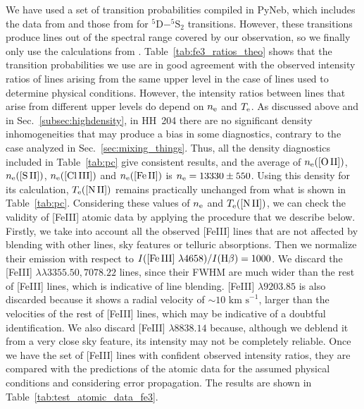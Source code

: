 \documentclass[twocolumn]{aastex63}
\begin{document}
We have used a set of transition probabilities compiled in PyNeb, which includes the data from  \citet[][]{Quinet96} and those from \citet[][]{Johansson00} for $^5\text{D}- ^5\text{S}_2$ transitions. However, these transitions produce lines out of the spectral range covered by our observation, so we finally only use the calculations from \citet[][]{Quinet96}. Table~\ref{tab:fe3_ratios_theo} shows that the transition probabilities we use are in good agreement with the observed intensity ratios of lines arising from the same upper level in the case of lines used to determine physical conditions. However, the intensity ratios between lines that arise from different upper levels do depend on $n_{\rm e}$ and $T_{\rm e}$. As discussed above and in Sec.~\ref{subsec:highdensity}, in HH~204 there are no significant density inhomogeneities that may produce a bias in some diagnostics, contrary to the case analyzed in Sec.~\ref{sec:mixing_things}. Thus, all the density diagnostics included in Table~\ref{tab:pc} give consistent results, and the average of $n_{\rm e}\text{([O\thinspace II])}$, $n_{\rm e}\text{([S\thinspace II])}$, $n_{\rm e}\text{([Cl\thinspace III])}$ and $n_{\rm e}\text{([Fe\thinspace II])}$ is $n_{\rm e}=13330 \pm 550$. Using this density for its calculation, $T_{\rm e}(\text{[N\thinspace II]})$ remains practically unchanged from what is shown in Table~\ref{tab:pc}. Considering these values of $n_{\rm e}$ and $T_{\rm e}(\text{[N\thinspace II]})$, we can check the validity of [Fe\thinspace III] atomic data by applying the procedure that we describe below.  Firstly, we take into account all the observed [Fe\thinspace III] lines that are not affected by blending with other lines, sky features or telluric absorptions. Then we normalize their emission with respect to $I(\text{[Fe\thinspace III] } \lambda 4658)/I(\text{H}\beta)=1000$. We discard the [Fe\thinspace III] $\lambda \lambda 3355.50, 7078.22$ lines, since their FWHM are much wider than the rest of [Fe\thinspace III] lines, which is indicative of line blending. [Fe\thinspace III] $\lambda 9203.85$ is also discarded because it shows a radial velocity of $\sim 10\text{ km s}^{-1}$,  larger than the velocities of the rest of [Fe\thinspace III] lines, which may be indicative of a doubtful identification. We also discard [Fe\thinspace III] $\lambda 8838.14$ because, although we deblend it from a very close sky feature, its intensity may not be completely reliable. Once we have the set of [Fe\thinspace III] lines with confident observed intensity ratios, they are compared with the predictions of the atomic data for the assumed physical conditions and considering error propagation. The results are shown in Table~\ref{tab:test_atomic_data_fe3}.
\end{document}
